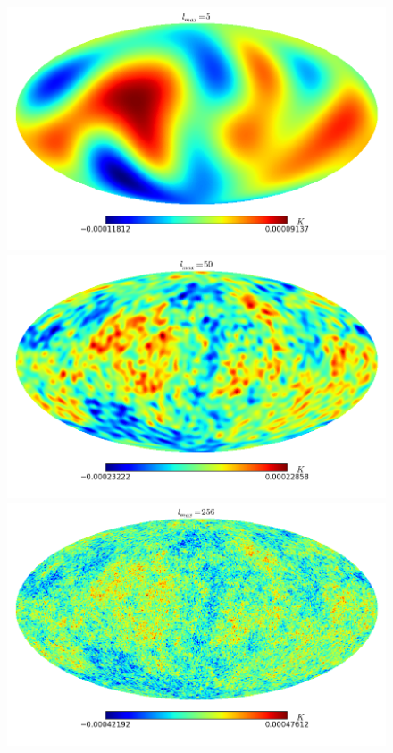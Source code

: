 \documentclass[11pt, a4paper,oneside,openright]{book}
\numberwithin{equation}{section}
\begin{document}
\begin{figure}
\begin{center}
\includegraphics[scale=0.3]{CMB/l5.png}
\includegraphics[scale=0.3]{CMB/l50.png}
\includegraphics[scale=0.3]{CMB/l256.png}

\end{center}
\end{figure}
\end{document}
